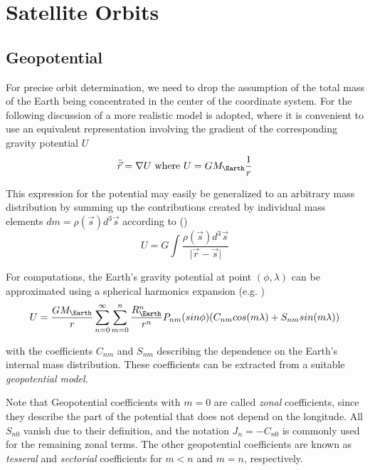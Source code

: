 \chapter{Satellite Orbits}
\label{ch:satellite-orbits}

\section{Geopotential}
For precise orbit determination, we need to drop the assumption of the total mass 
of the Earth being concentrated in the center of the coordinate system. For the
following discussion of a more realistic model is adopted, where it is convenient 
to use an equivalent representation involving the gradient of the corresponding 
gravity potential \(U\)
\begin{equation}
    \ddot{\vec{r}} = \nabla U \textrm{ where } U = G M_{\Earth} \frac{1}{r}
\end{equation}

This expression for the potential may easily be generalized to an arbitrary mass
distribution by summing up the contributions created by individual mass elements
\(dm = \rho(\vec{s}) d^3 \vec{s}\) according to (\cite{Montenbruck2000})
\begin{equation}
    U = G \int{\frac{\rho(\vec{s}) d^3 \vec{s}}{\lvert \vec{r} - \vec{s} \rvert}}
\end{equation}

For computations, the Earth's gravity potential at point \((\phi , \lambda)\) 
can be approximated using a spherical harmonics expansion 
(e.g. \cite{Montenbruck2000})
\begin{equation}
    U = \frac{G M_{\Earth}}{r} \sum_{n=0}^\infty \sum_{m=0}^n 
    \frac{R_{\Earth}^n}{r^n} P_{nm}(sin\phi) 
    (C_{nm} cos(m\lambda) + S_{nm} sin(m\lambda))
\end{equation}

with the coefficients \(C_{nm}\) and \(S_{nm}\) describing the dependence on the 
Earth's internal mass distribution. These coefficients can be extracted from a 
suitable  \emph{geopotential model}.

Note that Geopotential coefficients with \(m=0\) are called  \emph{zonal} coefficients, 
since they describe the part of the potential that does not depend on the longitude. 
All \(S_{n0}\) vanish due to their definition, and the notation \(J_n = -C_{n0}\) 
is commonly used for the remaining zonal terms. The other geopotential coefficients
are known as \emph{tesseral} and \emph{sectorial} coefficients for \(m<n\) and 
\(m = n\), respectively.

